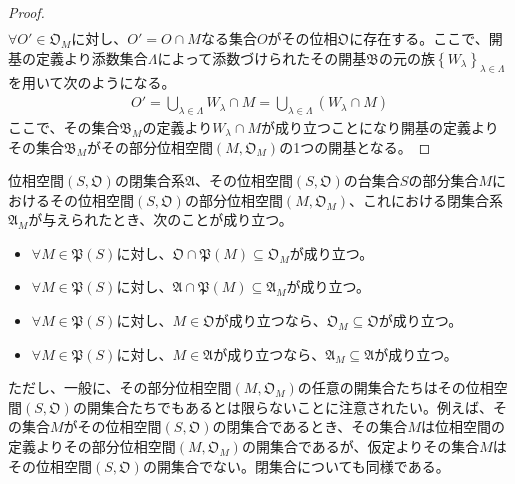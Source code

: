 \documentclass[dvipdfmx]{jsarticle}
\begin{document}
\begin{proof}
\begin{align*}
\end{align*}
$\forall O' \in \mathfrak{O}_{M}$に対し、$O' = O \cap M$なる集合$O$がその位相$\mathfrak{O}$に存在する。ここで、開基の定義より添数集合$\varLambda$によって添数づけられたその開基$\mathfrak{B}$の元の族$\left\{ W_{\lambda} \right\}_{\lambda \in \varLambda}$を用いて次のようになる。
\begin{align*}
O' = \bigcup_{\lambda \in \varLambda} W_{\lambda} \cap M = \bigcup_{\lambda \in \varLambda} \left( W_{\lambda} \cap M \right)
\end{align*}
ここで、その集合$\mathfrak{B}_{M}$の定義より$W_{\lambda} \cap M$が成り立つことになり開基の定義よりその集合$\mathfrak{B}_{M}$がその部分位相空間$\left( M,\mathfrak{O}_{M} \right)$の1つの開基となる。
\end{proof}
\begin{thm}\label{8.1.4.11}
位相空間$\left( S,\mathfrak{O} \right)$の閉集合系$\mathfrak{A}$、その位相空間$\left( S,\mathfrak{O} \right)$の台集合$S$の部分集合$M$におけるその位相空間$\left( S,\mathfrak{O} \right)$の部分位相空間$\left( M,\mathfrak{O}_{M} \right)$、これにおける閉集合系$\mathfrak{A}_{M}$が与えられたとき、次のことが成り立つ。
\begin{itemize}
\item
  $\forall M \in \mathfrak{P}(S)$に対し、$\mathfrak{O \cap P}(M) \subseteq \mathfrak{O}_{M}$が成り立つ。
\item
  $\forall M \in \mathfrak{P}(S)$に対し、$\mathfrak{A \cap}\mathfrak{P}(M) \subseteq \mathfrak{A}_{M}$が成り立つ。
\item
  $\forall M \in \mathfrak{P}(S)$に対し、$M \in \mathfrak{O}$が成り立つなら、$\mathfrak{O}_{M}\subseteq \mathfrak{O}$が成り立つ。
\item
  $\forall M \in \mathfrak{P}(S)$に対し、$M \in \mathfrak{A}$が成り立つなら、$\mathfrak{A}_{M}\subseteq \mathfrak{A}$が成り立つ。
\end{itemize}
\end{thm}
ただし、一般に、その部分位相空間$\left( M,\mathfrak{O}_{M} \right)$の任意の開集合たちはその位相空間$\left( S,\mathfrak{O} \right)$の開集合たちでもあるとは限らないことに注意されたい。例えば、その集合$M$がその位相空間$\left( S,\mathfrak{O} \right)$の閉集合であるとき、その集合$M$は位相空間の定義よりその部分位相空間$\left( M,\mathfrak{O}_{M} \right)$の開集合であるが、仮定よりその集合$M$はその位相空間$\left( S,\mathfrak{O} \right)$の開集合でない。閉集合についても同様である。
\end{document}
